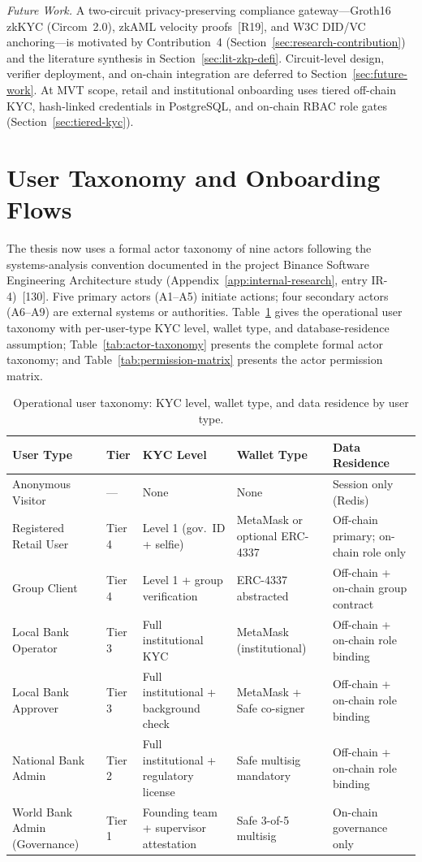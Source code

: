 \documentclass[12pt,a4paper]{report}
\newcommand{\tableheadcolor}{\rowcolor{TableHeadBg}}
\begin{document}
\noindent\textit{Future Work.} A two-circuit privacy-preserving compliance gateway---Groth16 zkKYC (Circom~2.0), zkAML velocity proofs~[R19], and W3C DID/VC anchoring---is motivated by Contribution~4 (Section~\ref{sec:research-contribution}) and the literature synthesis in Section~\ref{sec:lit-zkp-defi}. Circuit-level design, verifier deployment, and on-chain integration are deferred to Section~\ref{sec:future-work}. At MVT scope, retail and institutional onboarding uses tiered off-chain KYC, hash-linked credentials in PostgreSQL, and on-chain RBAC role gates (Section~\ref{sec:tiered-kyc}).

\section{User Taxonomy and Onboarding Flows}
\label{sec:onboarding}

The thesis now uses a formal actor taxonomy of nine actors following the systems-analysis convention documented in the project Binance Software Engineering Architecture study (Appendix~\ref{app:internal-research}, entry IR-4)~[130]. Five primary actors (A1--A5) initiate actions; four secondary actors (A6--A9) are external systems or authorities. Table~\ref{tab:user-taxonomy} gives the operational user taxonomy with per-user-type KYC level, wallet type, and database-residence assumption; Table~\ref{tab:actor-taxonomy} presents the complete formal actor taxonomy; and Table~\ref{tab:permission-matrix} presents the actor permission matrix.

\begin{table}[H]
\centering
\caption[Operational user taxonomy]{Operational user taxonomy: KYC level, wallet type, and data residence by user type.}
\label{tab:user-taxonomy}
\begin{tabular}{p{3.1cm}p{1.4cm}p{2.6cm}p{2.4cm}p{3.4cm}}
\toprule
\tableheadcolor
\textbf{User Type} & \textbf{Tier} & \textbf{KYC Level} & \textbf{Wallet Type} & \textbf{Data Residence} \\
\midrule
Anonymous Visitor & --- & None & None & Session only (Redis) \\
Registered Retail User & Tier 4 & Level 1 (gov.\ ID + selfie) & MetaMask or optional ERC-4337 & Off-chain primary; on-chain role only \\
Group Client & Tier 4 & Level 1 + group verification & ERC-4337 abstracted & Off-chain + on-chain group contract \\
Local Bank Operator & Tier 3 & Full institutional KYC & MetaMask (institutional) & Off-chain + on-chain role binding \\
Local Bank Approver & Tier 3 & Full institutional + background check & MetaMask + Safe co-signer & Off-chain + on-chain role binding \\
National Bank Admin & Tier 2 & Full institutional + regulatory license & Safe multisig mandatory & Off-chain + on-chain role binding \\
World Bank Admin (Governance) & Tier 1 & Founding team + supervisor attestation & Safe 3-of-5 multisig & On-chain governance only \\
\bottomrule
\end{tabular}
\end{table}
\end{document}
